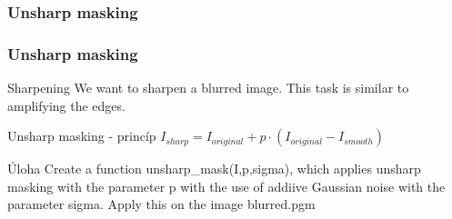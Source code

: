 \documentclass{beamer}
\begin{document}
\begin{frame}
\frametitle{Unsharp masking} 
\noindent{}
\end{frame}

\begin{frame}
\frametitle{Unsharp masking} 
  \begin{block}{Sharpening}
    We want to sharpen a blurred image. This task is similar to amplifying the edges.
  \end{block} 
 
  \begin{block}{Unsharp masking - princíp}
    $I_{sharp} = I_{original} + p \cdot \left( I_{original} - I_{smooth} \right)$
  \end{block}
  
  \begin{block}{Úloha}
  Create a function unsharp\_mask(I,p,sigma), which applies unsharp masking with the parameter p with the use of addiive Gaussian noise with the parameter sigma. Apply this on the image blurred.pgm
  \end{block}
\end{frame}
\end{document}
